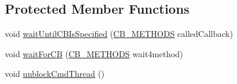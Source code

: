 \subsection*{Protected Member Functions}
\begin{DoxyCompactItemize}
\item 
void \hyperlink{classgov_1_1nasa_1_1jpf_1_1inspector_1_1client_1_1_callback_execution_decorator_abc8ba1848d45494678b0a9f2c130dd23}{wait\+Until\+C\+B\+Is\+Specified} (\hyperlink{enumgov_1_1nasa_1_1jpf_1_1inspector_1_1interfaces_1_1_inspector_call_backs_1_1_c_b___m_e_t_h_o_d_s}{C\+B\+\_\+\+M\+E\+T\+H\+O\+DS} called\+Callback)
\item 
void \hyperlink{classgov_1_1nasa_1_1jpf_1_1inspector_1_1client_1_1_callback_execution_decorator_a81a8e4d1b644aac0626648e3a42e0276}{wait\+For\+CB} (\hyperlink{enumgov_1_1nasa_1_1jpf_1_1inspector_1_1interfaces_1_1_inspector_call_backs_1_1_c_b___m_e_t_h_o_d_s}{C\+B\+\_\+\+M\+E\+T\+H\+O\+DS} wait4method)
\item 
void \hyperlink{classgov_1_1nasa_1_1jpf_1_1inspector_1_1client_1_1_callback_execution_decorator_a27970d201d0e36472350baacdb705105}{unblock\+Cmd\+Thread} ()
\end{DoxyCompactItemize}
